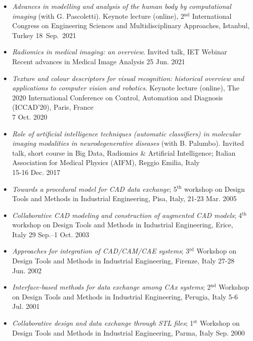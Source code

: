 \documentclass[11pt]{article}
\begin{document}
\begin{itemize}
\item \emph{Advances in modelling and analysis of the human body by computational imaging} (with G. Pascoletti). Keynote lecture (online), 2$^\text{nd}$ International Congress on Engineering Sciences and Multidisciplinary Approaches, Istanbul, Turkey \hfill 18~Sep.~2021

\item \emph{Radiomics in medical imaging: an overview}. Invited talk, IET Webinar Recent advances in Medical Image Analysis \hfill 25 Jun. 2021

\item \emph{Texture and colour descriptors for visual recognition: historical overview and applications to computer vision and robotics}. Keynote lecture (online), The 2020 International Conference on Control, Automation and Diagnosis (ICCAD’20), Paris, France \\ \mbox{} \hfill 7 Oct. 2020

\item \emph{Role of artificial intelligence techniques (automatic classifiers) in molecular imaging modalities in neurodegenerative diseases} (with B. Palumbo). Invited talk, short course in Big Data, Radiomics \& Artificial Intelligence; Italian Association for Medical Physics (AIFM), Reggio Emilia, Italy \\ \mbox{} \hfill 15-16 Dec. 2017
	\item \emph{Towards a procedural model for CAD data exchange}; 5$^\text{th}$ workshop on Design Tools and Methods in Industrial Engineering, Pisa, Italy, \hfill 21-23 Mar. 2005
	\item \emph{Collaborative CAD modeling and construction of augmented CAD models}; 4$^\text{th}$ workshop on Design Tools and Methods in Industrial Engineering, Erice, Italy \hfill 29 Sep.--1 Oct. 2003
	\item \emph{Approaches for integration of CAD/CAM/CAE systems}; 3$^\text{rd}$ Workshop on Design Tools and Methods in Industrial Engineering, Firenze, Italy \hfill 27-28 Jun. 2002
	\item \emph{Interface-based methods for data exchange among CAx systems}; 2$^\text{nd}$ Workshop on Design Tools and Methods in Industrial Engineering, Perugia, Italy \hfill 5-6 Jul. 2001
	\item \emph{Collaborative design and data exchange through STL files}; 1$^\text{st}$ Workshop on Design Tools and Methods in Industrial Engineering, Parma, Italy \hfill Sep. 2000
\end{itemize}
\end{document}
